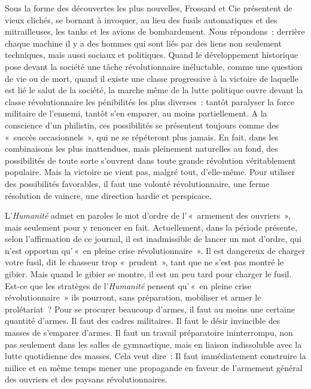 \documentclass[french,twoside]{book} %
\begin{document}
Sous la forme des découvertes les plus nouvelles, Frossard et Cie présentent de vieux clichés, se bornant à invoquer, au lieu des fusils automatiques et des mitrailleuses, les tanks et les avions de bombardement. Nous répondons : derrière chaque machine il y a des hommes qui sont liés par des liens non seulement techniques, mais aussi sociaux et politiques. Quand le développement historique pose devant la société une tâche révolutionnaire inéluctable, comme une question de vie ou de mort, quand il existe une classe progressive à la victoire de laquelle est lié le salut de la société, la marche même de la lutte politique ouvre devant la classe révolutionnaire les pénibilités les plus diverses : tantôt paralyser la force militaire de l’ennemi, tantôt s’en emparer, au moins partiellement. A la conscience d’un philistin, ces possibilités se présentent toujours comme des « succès occasionnels », qui ne se répéteront plus jamais. En fait,  dans les combinaisons les plus inattendues, mais pleinement naturelles au fond, des possibilités de toute sorte s’ouvrent dans toute grande révolution véritablement populaire. Mais la victoire ne vient pas, malgré tout, d’elle-même. Pour utiliser des possibilités favorables, il faut une volonté révolutionnaire, une ferme résolution de vaincre, une direction hardie et perspicace.\par
L’\emph{Humanité} admet en paroles le mot d’ordre de l’ « armement des ouvriers », mais seulement pour y renoncer en fait. Actuellement, dans la période présente, selon l’affirmation de ce journal, il est inadmissible de lancer un mot d’ordre, qui n’est opportun qu’ « en pleine crise révolutionnaire ». Il est dangereux de charger votre fusil, dit le chasseur trop « prudent », tant que ne s’est pas montré le gibier. Mais quand le gibier se montre, il est un peu tard pour charger le fusil. Est-ce que les stratèges de l’\emph{Humanité} pensent qu’ « en pleine crise révolutionnaire » ils pourront, sans préparation, mobiliser et armer le prolétariat ? Pour se procurer beaucoup d’armes, il faut au moins une certaine quantité d’armes. Il faut des cadres militaires. Il faut le désir invincible des masses de s’emparer d’armes. Il faut un travail préparatoire ininterrompu, non pas seulement dans les salles de gymnastique, mais en liaison indissoluble avec la lutte quotidienne des masses. Cela veut dire : Il faut immédiatement construire la milice et en même temps mener une propagande en faveur de l’armement général des ouvriers et des paysans révolutionnaires.
\end{document}
